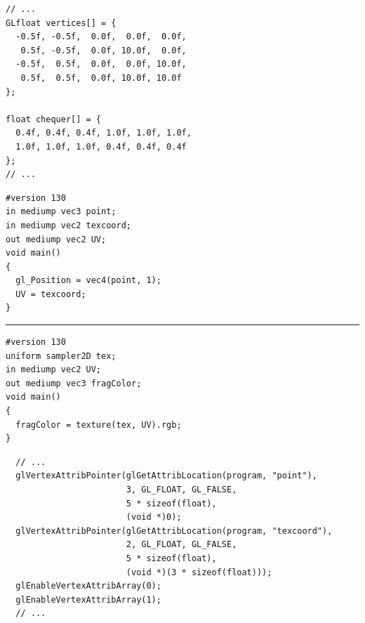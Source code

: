 \documentclass[calcdimensions,landscape,letterpaper]{powersem}
\newcommand{\thecurrentheading}{}
\newcommand{\heading}[1]{\renewcommand{\thecurrentheading}{#1}}
\begin{document}
\begin{slide}
    \heading{Texture Coordinates and Data}
    \begin{center}
        \begin{minipage}[c]{.7\textwidth}
            \begin{verbatim}
// ...
GLfloat vertices[] = {
  -0.5f, -0.5f,  0.0f,  0.0f,  0.0f,
   0.5f, -0.5f,  0.0f, 10.0f,  0.0f,
  -0.5f,  0.5f,  0.0f,  0.0f, 10.0f,
   0.5f,  0.5f,  0.0f, 10.0f, 10.0f
};

float chequer[] = {
  0.4f, 0.4f, 0.4f, 1.0f, 1.0f, 1.0f,
  1.0f, 1.0f, 1.0f, 0.4f, 0.4f, 0.4f
};
// ...
            \end{verbatim}
        \end{minipage}
    \end{center}
\end{slide}

\begin{slide}
    \heading{Shaders using Texture}
    \begin{center}
        \begin{minipage}[c]{.5\textwidth}
            \begin{verbatim}
#version 130
in mediump vec3 point;
in mediump vec2 texcoord;
out mediump vec2 UV;
void main()
{
  gl_Position = vec4(point, 1);
  UV = texcoord;
}
            \end{verbatim}
            \vspace{-10pt}
            \rule{4cm}{0.4pt}
            \begin{verbatim}
#version 130
uniform sampler2D tex;
in mediump vec2 UV;
out mediump vec3 fragColor;
void main()
{
  fragColor = texture(tex, UV).rgb;
}
            \end{verbatim}
        \end{minipage}
    \end{center}
\end{slide}

\begin{slide}
    \heading{Multiple Vertex Attributes}
    \begin{center}
        \begin{minipage}[c]{.95\textwidth}
            \begin{verbatim}
  // ...
  glVertexAttribPointer(glGetAttribLocation(program, "point"),
                        3, GL_FLOAT, GL_FALSE,
                        5 * sizeof(float),
                        (void *)0);
  glVertexAttribPointer(glGetAttribLocation(program, "texcoord"),
                        2, GL_FLOAT, GL_FALSE,
                        5 * sizeof(float),
                        (void *)(3 * sizeof(float)));
  glEnableVertexAttribArray(0);
  glEnableVertexAttribArray(1);
  // ...
            \end{verbatim}
        \end{minipage}
    \end{center}
\end{slide}
\end{document}
